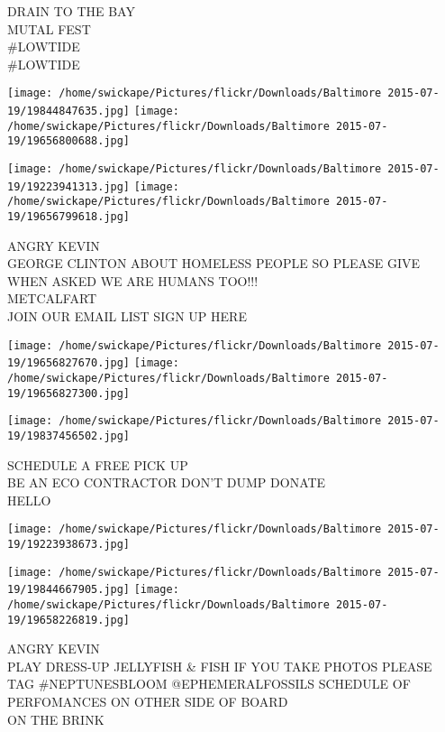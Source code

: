 \documentclass[10pt,letterpaper]{article}
\begin{document}
DRAIN TO THE BAY\\
MUTAL FEST\\
\#LOWTIDE\\
\#LOWTIDE\\
\pagebreak

\texttt{[image: /home/swickape/Pictures/flickr/Downloads/Baltimore 2015-07-19/19844847635.jpg]}
\texttt{[image: /home/swickape/Pictures/flickr/Downloads/Baltimore 2015-07-19/19656800688.jpg]}

\texttt{[image: /home/swickape/Pictures/flickr/Downloads/Baltimore 2015-07-19/19223941313.jpg]}
\texttt{[image: /home/swickape/Pictures/flickr/Downloads/Baltimore 2015-07-19/19656799618.jpg]}

ANGRY KEVIN\\
GEORGE CLINTON ABOUT HOMELESS PEOPLE SO PLEASE GIVE WHEN ASKED WE ARE HUMANS TOO!!!\\
METCALFART\\
JOIN OUR EMAIL LIST SIGN UP HERE\\
\pagebreak

\texttt{[image: /home/swickape/Pictures/flickr/Downloads/Baltimore 2015-07-19/19656827670.jpg]}
\texttt{[image: /home/swickape/Pictures/flickr/Downloads/Baltimore 2015-07-19/19656827300.jpg]}

\texttt{[image: /home/swickape/Pictures/flickr/Downloads/Baltimore 2015-07-19/19837456502.jpg]}

SCHEDULE A FREE PICK UP\\
BE AN ECO CONTRACTOR DON'T DUMP DONATE\\
HELLO\\
\pagebreak

\texttt{[image: /home/swickape/Pictures/flickr/Downloads/Baltimore 2015-07-19/19223938673.jpg]}

\vspace{0.25in}
\texttt{[image: /home/swickape/Pictures/flickr/Downloads/Baltimore 2015-07-19/19844667905.jpg]}
\texttt{[image: /home/swickape/Pictures/flickr/Downloads/Baltimore 2015-07-19/19658226819.jpg]}

ANGRY KEVIN\\
PLAY DRESS{-}UP JELLYFISH \& FISH IF YOU TAKE PHOTOS PLEASE TAG \#NEPTUNESBLOOM @EPHEMERALFOSSILS SCHEDULE OF PERFOMANCES ON OTHER SIDE OF BOARD\\
ON THE BRINK\\
\pagebreak
\end{document}
